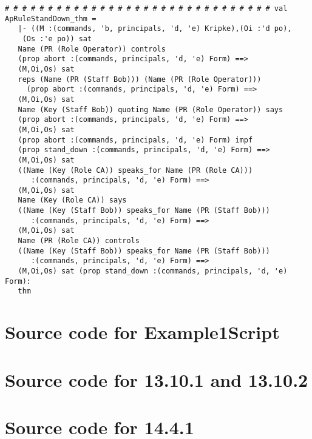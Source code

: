 \documentclass{report}
\begin{document}
\begin{session}
  \begin{scriptsize}
\begin{verbatim}
# # # # # # # # # # # # # # # # # # # # # # # # # # # # # # # val ApRuleStandDown_thm =
   |- ((M :(commands, 'b, principals, 'd, 'e) Kripke),(Oi :'d po),
    (Os :'e po)) sat
   Name (PR (Role Operator)) controls
   (prop abort :(commands, principals, 'd, 'e) Form) ==>
   (M,Oi,Os) sat
   reps (Name (PR (Staff Bob))) (Name (PR (Role Operator)))
     (prop abort :(commands, principals, 'd, 'e) Form) ==>
   (M,Oi,Os) sat
   Name (Key (Staff Bob)) quoting Name (PR (Role Operator)) says
   (prop abort :(commands, principals, 'd, 'e) Form) ==>
   (M,Oi,Os) sat
   (prop abort :(commands, principals, 'd, 'e) Form) impf
   (prop stand_down :(commands, principals, 'd, 'e) Form) ==>
   (M,Oi,Os) sat
   ((Name (Key (Role CA)) speaks_for Name (PR (Role CA)))
      :(commands, principals, 'd, 'e) Form) ==>
   (M,Oi,Os) sat
   Name (Key (Role CA)) says
   ((Name (Key (Staff Bob)) speaks_for Name (PR (Staff Bob)))
      :(commands, principals, 'd, 'e) Form) ==>
   (M,Oi,Os) sat
   Name (PR (Role CA)) controls
   ((Name (Key (Staff Bob)) speaks_for Name (PR (Staff Bob)))
      :(commands, principals, 'd, 'e) Form) ==>
   (M,Oi,Os) sat (prop stand_down :(commands, principals, 'd, 'e) Form):
   thm
\end{verbatim}
  \end{scriptsize}
\end{session}

\appendix{}

\chapter{Source code for Example1Script}
\label{cha:source-code-ex1}

\chapter{Source code for 13.10.1 and 13.10.2}
\label{cha:source-code-13-10-1-2}


\chapter{Source code for 14.4.1}
\label{cha:source-code-14-4-1}

\end{document}
